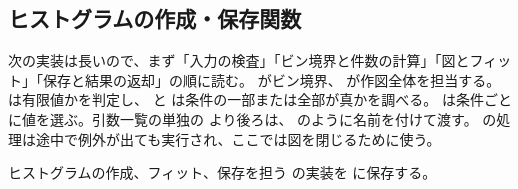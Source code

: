 \subsection{ヒストグラムの作成・保存関数}

次の実装は長いので、まず「入力の検査」「ビン境界と件数の計算」「図とフィット」「保存と結果の返却」の順に読む。 がビン境界、 が作図全体を担当する。 は有限値かを判定し、 と  は条件の一部または全部が真かを調べる。 は条件ごとに値を選ぶ。引数一覧の単独の \code{*} より後ろは、 のように名前を付けて渡す。 の処理は途中で例外が出ても実行され、ここでは図を閉じるために使う。

ヒストグラムの作成、フィット、保存を担う  の実装を  に保存する。

